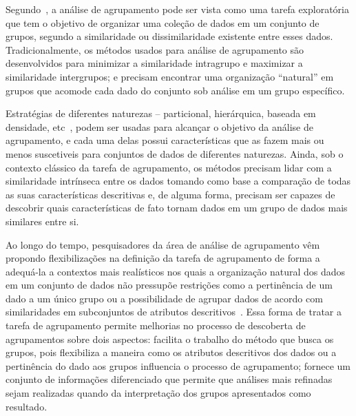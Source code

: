 \documentclass[
    12pt,                %
    oneside,            %
    a4paper,            %
    english,            %
    brazil                %
    ]{abntex2ppgsi}
\begin{document}


Segundo~, a análise de agrupamento pode ser vista como uma tarefa exploratória que tem o objetivo de organizar uma coleção de dados em um conjunto de grupos, segundo a similaridade ou dissimilaridade existente entre esses dados.
Tradicionalmente, os métodos usados para análise de agrupamento são desenvolvidos para minimizar a similaridade intragrupo e maximizar a similaridade intergrupos; e precisam encontrar uma organização ``natural'' em grupos que acomode cada dado do conjunto sob análise em um grupo específico.

Estratégias de diferentes naturezas -- particional, hierárquica, baseada em densidade, etc~\cite{Han2011,Xu2005}, podem ser usadas para alcançar o objetivo da análise de agrupamento, e cada uma delas possui características que as fazem mais ou menos suscetiveis para conjuntos de dados de diferentes naturezas.
Ainda, sob o contexto clássico da tarefa de agrupamento, os métodos precisam lidar com a similaridade intrínseca entre os dados tomando como base a comparação de todas as suas características descritivas e, de alguma forma, precisam ser capazes de descobrir quais características de fato tornam dados em um grupo de dados mais similares entre si.

Ao longo do tempo, pesquisadores da área de análise de agrupamento vêm propondo flexibilizações na definição da tarefa de agrupamento de forma a adequá-la a contextos mais realísticos nos quais a organização natural dos dados em um conjunto de dados não pressupõe restrições como a pertinência de um dado a um único grupo ou a possibilidade de agrupar dados de acordo com similaridades em subconjuntos de atributos descritivos~\cite{Bezdek1981,Han2011,Peres2012}.
Essa forma de tratar a tarefa de agrupamento permite melhorias no processo de descoberta de agrupamentos sobre dois aspectos: facilita o trabalho do método que busca os grupos, pois flexibiliza a maneira como os atributos descritivos dos dados ou a pertinência do dado aos grupos influencia o processo de agrupamento; fornece um conjunto de informações diferenciado que permite que análises mais refinadas sejam realizadas quando da interpretação dos grupos apresentados como resultado.
\end{document}

